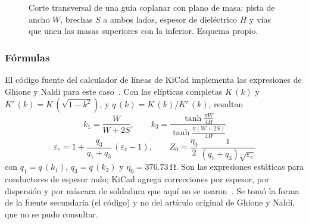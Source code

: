 \begin{figure}[H]
  \centering
  \caption[Corte transversal de una CPWG.]{Corte transversal de una guía coplanar con plano de masa: pista de ancho $W$, brechas $S$ a ambos lados, espesor de dieléctrico $H$ y vías que unen las masas superiores con la inferior. Esquema propio.}\label{fig:layout-cpwg}
\end{figure}

\subsubsection{Fórmulas}

El código fuente del calculador de líneas de KiCad implementa las expresiones de Ghione y Naldi para este caso~\cite{kicadcoplanar,ghione83}. Con las elípticas completas $K\,(k)$ y $K'\,(k) = K\,(\sqrt{1-k^2})$, y $q\,(k) = K\,(k)/K'\,(k)$, resultan
\begin{equation}\label{eq:layout-cpwg-k}
  k_1 = \frac{W}{W + 2S}, \qquad k_3 = \frac{\tanh \frac{\pi W}{4H}}{\tanh \frac{\pi (W + 2S)}{4H}}
\end{equation}
\begin{equation}\label{eq:layout-cpwg-z}
  \varepsilon_e = 1 + \frac{q_3}{q_1 + q_3}\,(\varepsilon_r - 1), \qquad Z_0 = \frac{\eta_0}{2}\,\frac{1}{(q_1 + q_3)\sqrt{\varepsilon_e}}
\end{equation}
con $q_1 = q\,(k_1)$, $q_3 = q\,(k_3)$ y $\eta_0 = \SI{376,73}{\ohm}$. Son las expresiones estáticas para conductores de espesor nulo; KiCad agrega correcciones por espesor, por dispersión y por máscara de soldadura que aquí no se usaron~\cite{kicadcoplanar}. Se tomó la forma de la fuente secundaria (el código) y no del artículo original de Ghione y Naldi, que no se pudo consultar.

